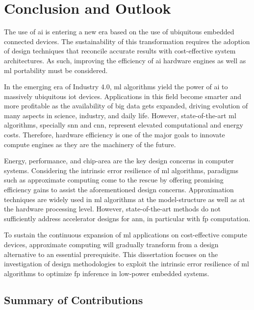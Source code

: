 \chapter{Conclusion and Outlook}
\label{chap.conclusion}
\minitoc
The use of \gls{ai} is entering a new era based on the use of ubiquitous embedded connected devices. The sustainability of this transformation requires the adoption of design techniques that reconcile accurate results with cost-effective system architectures. As such, improving the efficiency of \gls{ai} hardware engines as well as \gls{ml} portability must be considered.

In the emerging era of Industry 4.0, \gls{ml} algorithms yield the power of \gls{ai} to massively ubiquitous \gls{iot} devices. Applications in this field become smarter and more profitable as the availability of big data gets expanded, driving evolution of many aspects in science, industry, and daily life. However, state-of-the-art \gls{ml} algorithms, specially \gls{snn} and \gls{cnn}, represent elevated computational and energy costs. Therefore, hardware efficiency is one of the major goals to innovate compute engines as they are the machinery of the future.

Energy, performance, and chip-area are the key design concerns in computer systems. Considering the intrinsic error resilience of \gls{ml} algorithms, paradigms such as approximate computing come to the rescue by offering promising efficiency gains to assist the aforementioned design concerns. Approximation techniques are widely used in \gls{ml} algorithms at the model-structure as well as at the hardware processing level. However, state-of-the-art methods do not sufficiently address accelerator designs for \gls{ann}, in particular with \gls{fp} computation.

To sustain the continuous expansion of \gls{ml} applications on cost-effective compute devices, approximate computing will gradually transform from a design alternative to an essential prerequisite. This dissertation focuses on the investigation of design methodologies to exploit the intrinsic error resilience of \gls{ml} algorithms to optimize \gls{fp} inference in low-power embedded systems.

\section{Summary of Contributions}


